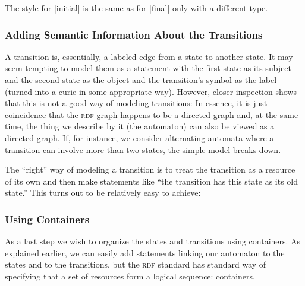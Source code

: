The style for |initial| is the same as for |final| only with a
different type.



\subsubsection{Adding Semantic Information About the Transitions}

A transition is, essentially, a labeled edge from a state to another
state. It may seem tempting to model them as a statement with the
first state as its subject and the second state as the object and the
transition's symbol as the label (turned into a curie in some
appropriate way). However, closer inspection shows that this is not a
good way of modeling transitions: In essence, it is just coincidence
that the \textsc{rdf} graph happens to be a directed graph and, at the
same time, the thing we describe by it (the automaton) can also be
viewed as a directed graph. If, for instance, we consider alternating
automata where a transition can involve more than two states, the
simple model breaks down.

The ``right'' way of modeling a transition is to treat the transition
as a resource of its own and then make statements like ``the
transition has this state as its old state.'' This turns out to be
relatively easy to achieve:




\subsubsection{Using Containers}

As a last step we wish to organize the states and transitions using
containers. As explained earlier, we can easily add statements linking
our automaton to the states and to the transitions, but the
\textsc{rdf} standard has standard way of specifying that a set of
resources form a logical sequence: containers.

